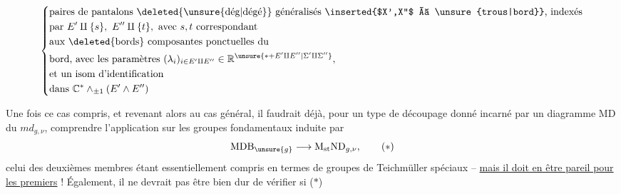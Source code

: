 \[
\left\{\begin{aligned}
&\text{paires de pantalons \deleted{\unsure{dég|dégé}} généralisés \inserted{$X',X''$ à \unsure{trous|bord}}, indexés}\\
&\text{par }E'\amalg\{s\},\ E''\amalg\{t\},\ \text{avec }s,t\text{ correspondant}\\
&\text{aux \deleted{bords} composantes ponctuelles du}\\
&\text{bord, avec les paramètres }(\lambda_i)_{i\in E'\amalg E''}\in\mathbb R^{\unsure{*+E'\amalg E''|\Sigma'\amalg\Sigma''}},\\
&\text{et un isom d'identification}\\
&\text{dans }\mathbb C^*\wedge_{\pm1}(E'\wedge E'')
\end{aligned}\right.
\]

Une fois ce cas compris, et revenant alors au cas général, il faudrait déjà, pour un type de découpage donné incarné par un diagramme $\mathrm{MD}$ du $md_{g,\nu}$, comprendre l'application sur les groupes fondamentaux induite par
\[
\mathrm{MDB}_{\unsure{g}}\longrightarrow \mathrm M_{\mathrm{st}}\mathrm{ND}_{g,\nu}, \tag*{($*$)}
\]
celui des deuxièmes membres étant essentiellement compris en termes de groupes de Teichmüller spéciaux -- \uline{mais il doit en être pareil pour les premiers} ! Également, il ne devrait pas être bien dur de vérifier si ($*$)
